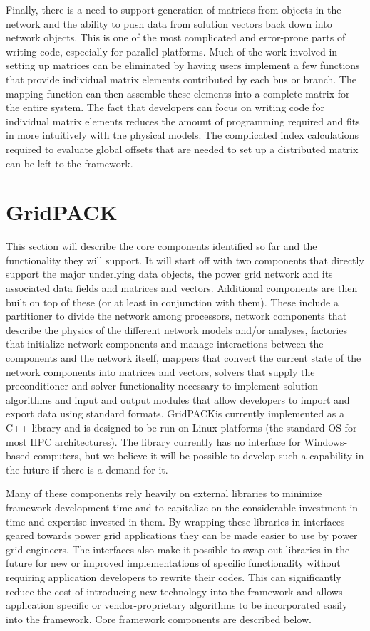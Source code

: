\documentclass[preprint]{acm_proc_article-sp}
\begin{document}
Finally, there is a need to support generation of matrices from objects in the
network and the ability to push data from solution vectors back down into
network objects. This is one of the most complicated and error-prone parts of
writing code, especially for parallel platforms. Much of the work involved in
setting up matrices can be eliminated by having users implement a few functions
that provide individual matrix elements contributed by each bus or branch. The
mapping function can then assemble these elements into a complete matrix for the
entire system. The fact that developers can focus on writing code for individual
matrix elements reduces the amount of programming required and fits in more
intuitively with the physical models. The complicated index calculations
required to evaluate global offsets that are needed to set up a distributed
matrix can be left to the framework.

\section{GridPACK\texttrademark}
This section will describe the core components identified so far and the functionality they
will support. It will start off with two components that directly support the major
underlying data objects, the power grid network and its associated data fields and matrices
and vectors. Additional components are then built on top of these (or at least in
conjunction with them). These include a partitioner to divide the network among
processors, network components that describe the physics of the different network
models and/or
analyses, factories that initialize network components and manage interactions
between the components and the network itself, mappers that
convert the current state of the network components into matrices and vectors,
solvers that supply the preconditioner and solver
functionality necessary to implement solution algorithms and input and output modules that
allow developers to import and export data using standard formats.
GridPACK\texttrademark is currently implemented as a C++ library and is designed
to be run on Linux platforms (the standard OS for most HPC architectures).
The library currently has no interface for Windows-based computers, but we
believe it will be possible to develop such a capability in the future if there
is a demand for it.

Many of these components rely heavily on external libraries to minimize
framework development time and to capitalize on the considerable investment in
time and expertise invested in them. By wrapping these libraries in interfaces geared
towards power grid applications they can be made easier to use by power grid
engineers. The interfaces also make it possible to swap out libraries in the future for new
or improved implementations of specific functionality without requiring application
developers to rewrite their codes. This can significantly reduce the cost of introducing
new technology into the framework and allows application specific or
vendor-proprietary algorithms to be incorporated easily into the framework.
Core framework components are described below.
\end{document}
